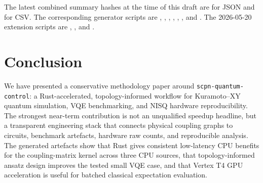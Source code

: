 \documentclass[preprint,aps,physrev,superscriptaddress,floatfix,longbibliography]{revtex4-2}
\begin{document}
%
The latest combined summary hashes at the time of this draft are
\texttt{}
for JSON and
\texttt{}
for CSV. The corresponding generator scripts are
,
,
,
,
,
, and
. The 2026-05-20
extension scripts are
,
, and
.

\section{Conclusion}

We have presented a conservative methodology paper around
\texttt{scpn-quantum-control}: a Rust-accelerated, topology-informed
workflow for Kuramoto--XY quantum simulation, VQE benchmarking, and NISQ
hardware reproducibility. The strongest near-term contribution is not an
unqualified speedup headline, but a transparent engineering stack that
connects physical coupling graphs to circuits, benchmark artefacts,
hardware raw counts, and reproducible analysis. The generated artefacts
show that Rust gives consistent low-latency CPU benefits for the
coupling-matrix kernel across three CPU sources, that topology-informed
ansatz design improves the tested small VQE case, and that Vertex T4 GPU
acceleration is useful for batched classical expectation evaluation.
\end{document}
